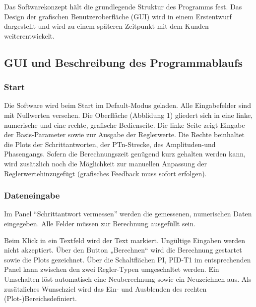 Das Softwarekonzept  h\"alt die grundlegende Struktur  des Programms fest. Das
Design der  grafischen Benutzeroberfl\"ache  (GUI) wird in  einem Erstentwurf
dargestellt  und wird  zu   einem  sp\"ateren   Zeitpunkt  mit   dem  Kunden
weiterentwickelt.


\subsection{GUI und Beschreibung des Programmablaufs}



\subsubsection*{Start}
Die  Software wird  beim  Start im  Default-Modus geladen. Alle  Eingabefelder
sind  mit Nullwerten  versehen. Die Oberfl\"ache  (Abblidung 1)  gliedert sich
in  eine  linke,  numerische  und  eine  rechte,  grafische  Bedienseite. Die
linke  Seite  zeigt   Eingabe  der  Basis-Parameter  sowie   zur  Ausgabe  der
Reglerwerte. Die   Rechte   beinhaltet   die   Plots   der   Schrittantworten,
der    PTn-Strecke\footnotemark[1],   des    Amplituden-\footnotemark[1]   und
Phasengangs\footnotemark[1]. Sofern   die   Berechnungszeit  gen\"ugend   kurz
gehalten werden kann,  wird zus\"atzlich noch die  M\"oglichkeit zur manuellen
Anpassung der Reglerwerte\footnotemark[2]  hinzugef\"ugt (grafisches Feedback
muss sofort erfolgen).


\subsubsection*{Dateneingabe}
Im  Panel ``Schrittantwort  vermessen''  werden  die gemessenen,  numerischen
Daten eingegeben. Alle Felder m\"ussen zur Berechnung ausgef\"ullt sein.

Beim  Klick  in ein  Textfeld  wird  der Text  markiert. Ung\"ultige  Eingaben
werden nicht  akzeptiert.  \"Uber den  Button „Berechnen“ wird  die Berechnung
gestartet sowie die  Plots gezeichnet.  \"Uber die  Schaltfl\"achen PI, PID-T1
im  entsprechenden Panel   kann  zwischen den  zwei Regler-Typen  umgeschaltet
werden. Ein  Umschalten  l\"ost  automatisch   eine  Neuberechnung  sowie  ein
Neuzeichnen aus. Als  zus\"atzliches Wunschziel wird das  Ein- und Ausblenden
des rechten (Plot-)Bereichs\footnotemark[1] definiert.


